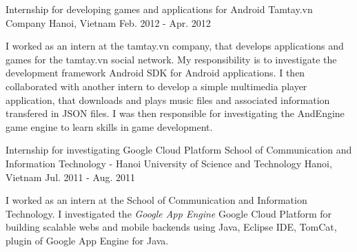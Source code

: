 \cventry
{Internship for developing games and applications for Android} %
{Tamtay.vn Company} %
{Hanoi, Vietnam} %
{Feb. 2012 - Apr. 2012} %
{ %
	\begin{cvitems}
		\item {I worked as an intern at the tamtay.vn company, that develops applications and games for the tamtay.vn social network. My responsibility is to investigate the development framework Android SDK for Android applications. I then collaborated with another intern to develop a simple multimedia player application, that downloads and plays music files and associated information transfered in JSON files. I was then responsible for investigating the AndEngine game engine to learn skills in game development.}		
	\end{cvitems}
}

\cventry
{Internship for investigating Google Cloud Platform} %
{School of Communication and Information Technology - Hanoi University of Science and Technology} %
{Hanoi, Vietnam} %
{Jul. 2011 - Aug. 2011} %
{ %
	\begin{cvitems}
		\item {I worked as an intern at the School of Communication and Information Technology. I investigated the \textit{Google App Engine} Google Cloud Platform for building scalable webs and mobile backends using Java, Eclipse IDE, TomCat, plugin of Google App Engine for Java.}		
	\end{cvitems}
}